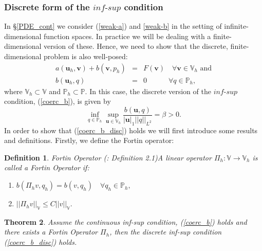 \documentclass[12pt,a4paper]{article}
\newtheorem{theorem}{Theorem}[section]
\newtheorem{definition}[theorem]{Definition}
\theoremstyle{definition}
\begin{document}
\subsubsection{Discrete form of the $\textit{inf-sup}$ condition}\label{PDE_disc}
In \S \ref{PDE_cont} we consider (\ref{weak-a}) and \ref{weak-b} in the setting of infinite-dimensional function spaces.  In practice we will be dealing with a finite-dimensional version of these.  Hence, we need to show that the discrete, finite-dimensional problem is also well-posed:
\begin{eqnarray}
		a\left(\textbf{u}_h,\textbf{v}\right) + b\left(\textbf{v},p_h\right) &=& F\left(\textbf{v}\right)\quad \forall 
	\textbf{v} \in \mathbb{V}_h \text{ and} \\
	b\left(\textbf{u}_h,q\right)&=&0 \quad \quad\quad\forall q \in\mathbb{P}_h,
\end{eqnarray}
where $\mathbb{V}_h\subset\mathbb{V}$ and $\mathbb{P}_h\subset\mathbb{P}$.  In this case, the discrete version of the $\textit{inf-sup}$ condition, (\ref{coerc_b}), is given by
\begin{equation}\label{coerc_b_disc}
	\inf_{q\in \mathbb{P}_h}\sup_{\textbf{u}\in \mathbb{V}_h}\frac{b\left(\textbf{u},q\right)}{\left|\textbf{u}\right|_1 \left|\left|q\right|\right|_{L^2}}=\beta>0.
\end{equation}
In order to show that (\ref{coerc_b_disc}) holds we will first introduce some results and definitions. Firstly, we define the Fortin operator:
\theoremstyle{definition}
\begin{definition}{Fortin Operator} (\cite{Chen2016}: Definition 2.1)\label{Fortin_defn}
	A linear operator $\Pi_h: \mathbb{V} \rightarrow \mathbb{V}_h$ is called a Fortin Operator if:
	\begin{enumerate}
	\item$b\left(\Pi_h v, q_h\right)=b\left(v, q_h\right)\quad \forall q_h \in \mathbb{P}_h,$
	\item $\left|\left|\Pi_h v\right|\right|_{\mathbb{V}}\leq C\left|\left|v\right|\right|_\mathbb{V}.$
	\end{enumerate}
\end{definition}
\begin{theorem}\label{theorem_inf_sup_disc}
	Assume the continuous inf-sup condition, (\ref{coerc_b}) holds and there exists a Fortin Operator $\Pi_h$, then the discrete inf-sup condition (\ref{coerc_b_disc}) holds.
\end{theorem}
\end{document}
